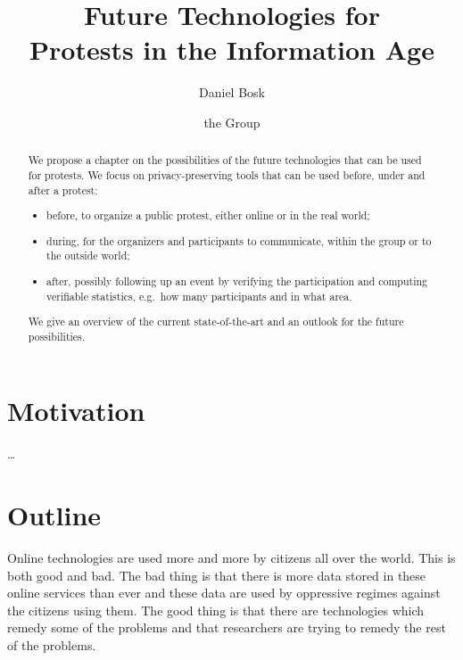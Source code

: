 \documentclass[a4paper]{llncs}
\title{%
  Future Technologies for\\
  Protests in the Information Age
}
\author{%
  Daniel Bosk
  \and
  the Group
}
\institute{%
  School of Computer Science and Communication,\\
  KTH Royal Institute of Technology,
  Stockholm\\
  \email{dbosk@kth.se}
}
\begin{document}
\maketitle

\begin{abstract}
  We propose a chapter on the possibilities of the future technologies that can 
  be used for protests.
  We focus on privacy-preserving tools that can be used before, under and after 
  a protest:
  \begin{itemize}
    \item before, to organize a public protest, either online or in the real 
      world;
    \item during, for the organizers and participants to communicate, within 
      the group or to the outside world;
    \item after, possibly following up an event by verifying the participation 
      and computing verifiable statistics, e.g.\ how many participants and in 
      what area.
  \end{itemize}
  We give an overview of the current state-of-the-art and an outlook for the 
  future possibilities.
\end{abstract}


\section{Motivation}
\dots


\section{Outline}

Online technologies are used more and more by citizens all over the world.
This is both good and bad.
The bad thing is that there is more data stored in these online services than 
ever and these data are used by oppressive regimes against the citizens using 
them.
The good thing is that there are technologies which remedy some of the problems 
and that researchers are trying to remedy the rest of the problems.
\end{document}
